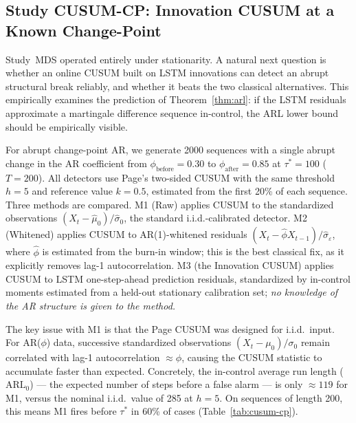 \documentclass[bj,authoryear]{imsart}
\theoremstyle{plain}
\theoremstyle{definition}
\begin{document}
\subsection{Study CUSUM-CP: Innovation CUSUM at a Known Change-Point}
\label{sec:cusum-cp}

Study~MDS operated entirely under stationarity.  A natural next question is
whether an online CUSUM built on LSTM innovations can detect an abrupt
structural break reliably, and whether it beats the two classical alternatives.
This empirically examines the prediction of Theorem~\ref{thm:arl}: if the LSTM residuals approximate
a martingale difference sequence in-control, the ARL lower bound should be
empirically visible.

For abrupt change-point AR, we generate 2000 sequences with a single abrupt change in the AR coefficient
from $\phi_{\mathrm{before}} = 0.30$ to $\phi_{\mathrm{after}} = 0.85$ at
$\tau^* = 100$ ($T = 200$).
All detectors use Page's two-sided CUSUM \citep{page1954continuous,lorden1971procedures} with
the same threshold $h = 5$ and reference value $k = 0.5$,
estimated from the first 20\% of each sequence.
Three methods are compared.  M1 (Raw) applies CUSUM to the standardized
observations $(X_t - \hat\mu_0)/\hat\sigma_0$, the standard i.i.d.-calibrated
detector.  M2 (Whitened) applies CUSUM to AR(1)-whitened residuals
$(X_t - \hat\phi X_{t-1})/\hat\sigma_\varepsilon$, where $\hat\phi$ is
estimated from the burn-in window; this is the best classical fix, as it
explicitly removes lag-1 autocorrelation.  M3 (the Innovation CUSUM) applies CUSUM to
LSTM one-step-ahead prediction residuals, standardized by in-control moments
estimated from a held-out stationary calibration set; \emph{no knowledge of
the AR structure is given to the method.}

The key issue with M1 is that the Page CUSUM was designed for i.i.d.\ input.
For AR($\phi$) data, successive standardized observations $(X_t - \mu_0)/\sigma_0$
remain correlated with lag-1 autocorrelation $\approx \phi$, causing the
CUSUM statistic to accumulate faster than expected.
Concretely, the in-control average run length (\(\mathrm{ARL}_0\)) --- the
expected number of steps before a false alarm --- is only $\approx 119$ for M1,
versus the nominal i.i.d.\ value of 285 at $h=5$.
On sequences of length 200, this means M1 fires before $\tau^*$ in 60\% of
cases (Table~\ref{tab:cusum-cp}).
\end{document}
